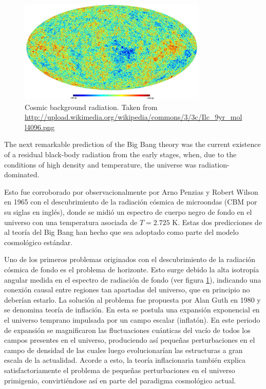 \
\begin{figure}[htbp]
	\centering
	\includegraphics[width=0.8\textwidth]
	{./figures/1_introduction/CMB.png}
	
	\caption{\small{Cosmic background radiation. Taken from 
	\url{http://upload.wikimedia.org/wikipedia/commons/3/3c/Ilc_9yr_moll4096.png}}}
	
	\label{fig:CMB}
\end{figure}



The next remarkable prediction of the Big Bang theory was the current 
existence of a residual black-body radiation from the early stages, when,
due to the conditions of high density and temperature, the universe was 
radiation-dominated.


Esto fue corroborado por observacionalmente por Arno Penzias y Robert
Wilson en 1965 con el descubrimiento de la radiación cósmica de microondas
(CBM por su siglas en inglés), donde se midió un espectro de cuerpo negro
de fondo en el universo con una temperatura asociada de $T = 2.725$ K. 
Estas dos predicciones de al teoría del Big Bang han hecho que sea 
adoptado como parte del modelo cosmológico estándar.


Uno de los primeros problemas originados con el descubrimiento de la 
radiación cósmica de fondo es el problema de horizonte. Esto surge debido
la alta isotropía angular medida en el espectro de radiación de fondo (ver 
figura \ref{fig:CMB}), indicando una conexión causal entre regiones tan 
apartadas del universo, que en principio no deberían estarlo. La solución 
al problema fue propuesta por Alan Guth en 1980 y se denomina teoría de 
inflación. En esta se postula una expansión exponencial en el universo 
temprano impulsada por un campo escalar (inflatón). En este periodo de 
expansión se magnificaron las fluctuaciones cuánticas del vacío de todos 
los campos presentes en el universo, produciendo así pequeñas perturbaciones 
en el campo de densidad de las cuales luego evolucionarían las estructuras 
a gran escala de la actualidad. Acorde a esto, la teoría inflacionaria 
también explica satisfactoriamente el problema de pequeñas perturbaciones 
en el universo primigenio, convirtiéndose así en parte del paradigma 
cosmológico actual.


